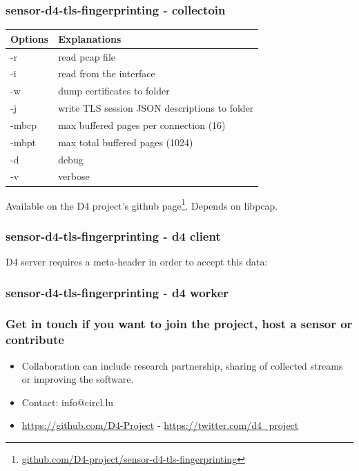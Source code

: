 \documentclass{beamer}
\begin{document}
\begin{frame}
        \frametitle{sensor-d4-tls-fingerprinting - collectoin}

  


\begin{tabular}{l|l}
Options & Explanations\\
\hline
  -r & read pcap file\\
  -i & read from the interface \\
  -w & dump certificates to folder\\
  -j & write TLS session JSON descriptions to folder\\
  -mbcp & max buffered pages per connection (16) \\
  -mbpt & max total buffered pages (1024) \\
  -d & debug \\
  -v & verbose
\end{tabular}

\vspace{.8cm}
Available on the D4 project's github page\footnote{\url{github.com/D4-project/sensor-d4-tls-fingerprinting}}.
Depends on libpcap.

\end{frame}


\begin{frame}
        \frametitle{sensor-d4-tls-fingerprinting - d4 client} 
        
        \vspace{.8cm}
        D4 server requires a meta-header in order to accept this data:
        
\end{frame}

\begin{frame}
        \frametitle{sensor-d4-tls-fingerprinting - d4 worker} 
        
\end{frame}


\begin{frame}
\frametitle{Get in touch if you want to join the project, host a sensor or contribute}
\begin{itemize}
\item Collaboration can include research partnership, sharing of collected streams or improving the software.
\item Contact: info@circl.lu
\item \url{https://github.com/D4-Project} -  \url{https://twitter.com/d4_project}
\end{itemize}
\end{frame}
\end{document}
